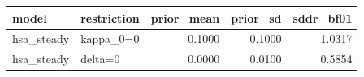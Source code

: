 \begin{tabular}{llrrr}
\toprule
model & restriction & prior\_mean & prior\_sd & sddr\_bf01 \\
\midrule
hsa\_steady & kappa\_0=0 & 0.1000 & 0.1000 & 1.0317 \\
hsa\_steady & delta=0 & 0.0000 & 0.0100 & 0.5854 \\
\bottomrule
\end{tabular}
